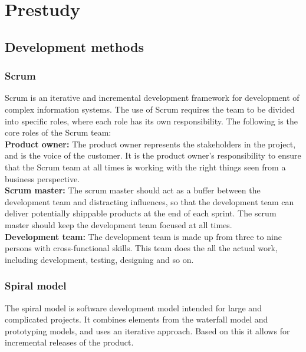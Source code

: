 \section{Prestudy}
\subsection{Development methods}
\subsubsection{Scrum}
Scrum is an iterative and incremental development framework for development of complex information systems. The use of Scrum requires the team to be divided into specific roles, where each role has its own responsibility. The following is the core roles of the Scrum team:\\
\textbf{Product owner:} The product owner represents the stakeholders in the project, and is the voice of the customer. It is the product owner’s responsibility to ensure that the Scrum team at all times is working with the right things seen from a business perspective.\\
\textbf{Scrum master:} The scrum master should act as a buffer between the development team and distracting influences, so that the development team can deliver potentially shippable products at the end of each sprint. The scrum master should keep the development team focused at all times.\\
\textbf{Development team:} The development team is made up from three to nine persons with cross-functional skills. This team does the all the actual work, including development, testing, designing and so on.

\subsubsection{Spiral model}
The spiral model is software development model intended for large and complicated projects. It combines elements from the waterfall model and prototyping models, and uses an iterative approach. Based on this it allows for incremental releases of the product.

